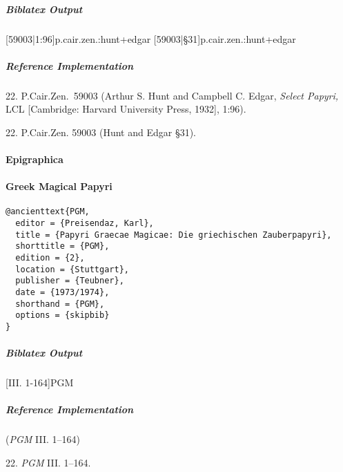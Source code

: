 \documentclass[a4paper]{article}
\newenvironment{biboutput}{%
  \subparagraph{Biblatex Output}
}{\color{black}}
\newenvironment{refimp}{%
  \subparagraph{Reference Implementation}
  \color{reference-colour}
  \rm
}{\par\color{black}}
\begin{document}
\begin{biboutput}
  [59003|1:96]{p.cair.zen.:hunt+edgar}
  [59003|§31]{p.cair.zen.:hunt+edgar}
\end{biboutput}

\begin{refimp}
  \hspace*{\bibindent}22. P.Cair.Zen.\ 59003 (Arthur S. Hunt and Campbell C.
  Edgar, \emph{Select Papyri,} LCL [Cambridge: Harvard University Press,
  1932], 1:96).

  \hspace*{\bibindent}22. P.Cair.Zen. 59003 (Hunt and Edgar §31).

\end{refimp}

\paragraph{Epigraphica}

\paragraph{Greek Magical Papyri}

\begin{lstlisting}
@ancienttext{PGM,
  editor = {Preisendaz, Karl},
  title = {Papyri Graecae Magicae: Die griechischen Zauberpapyri},
  shorttitle = {PGM},
  edition = {2},
  location = {Stuttgart},
  publisher = {Teubner},
  date = {1973/1974},
  shorthand = {PGM},
  options = {skipbib}
}
\end{lstlisting}

\begin{biboutput}
  [III. 1-164]{PGM}
\end{biboutput}

\begin{refimp}
  (\emph{PGM} III. 1–164)

  \hspace*{\bibindent}22. \emph{PGM} III. 1–164.

\end{refimp}

\medskip
\end{document}
